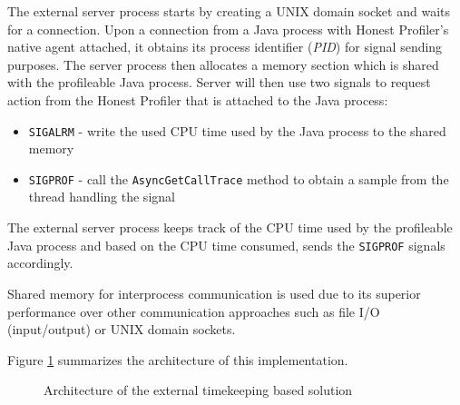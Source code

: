 \documentclass[..thesis.tex]{subfiles}
\begin{document}
The external server process starts by creating a UNIX domain socket and waits for a connection. Upon a connection from a Java process with Honest Profiler's native agent attached, it obtains its process identifier (\textit{PID}) for signal sending purposes. The server process then allocates a memory section which is shared with the profileable Java process. Server will then use two signals to request action from the Honest Profiler that is attached to the Java process:

\begin{itemize}
	\item \texttt{SIGALRM} - write the used CPU time used by the Java process to the shared memory
	\item \texttt{SIGPROF} - call the \texttt{Async\-Get\-Call\-Trace} method to obtain a sample from the thread handling the signal
\end{itemize}

The external server process keeps track of the CPU time used by the profileable Java process and based on the CPU time consumed, sends the \texttt{SIGPROF} signals accordingly.

Shared memory for interprocess communication is used due to its superior performance over other communication approaches such as file I/O (input/output) or UNIX domain sockets. 

Figure \ref{fig:shared_mem_arctitecture} summarizes the architecture of this implementation.
\begin{figure}[h]
\centering
{}
\caption{Architecture of the external timekeeping based solution}
\label{fig:shared_mem_arctitecture}
\end{figure}
\end{document}
